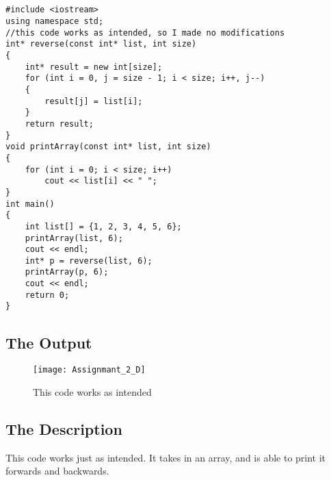 \documentclass[11pt]{article}
\begin{document}
\subsection*{}
\begin{lstlisting}
#include <iostream>
using namespace std;
//this code works as intended, so I made no modifications
int* reverse(const int* list, int size)
{
    int* result = new int[size];
    for (int i = 0, j = size - 1; i < size; i++, j--)
    {
        result[j] = list[i];
    }
    return result;
}
void printArray(const int* list, int size)
{
    for (int i = 0; i < size; i++)
        cout << list[i] << " ";
}
int main()
{
    int list[] = {1, 2, 3, 4, 5, 6};
    printArray(list, 6);
    cout << endl;
    int* p = reverse(list, 6);
    printArray(p, 6);
    cout << endl;
    return 0;
}
\end{lstlisting}

\subsection*{The Output}
\begin{figure}[H]
    \centering
    \texttt{[image: Assignmant\_2\_D]}
    \caption{This code works as intended}
    \label{fig:my_label}
\end{figure}

\subsection*{The Description}
This code works just as intended. It takes in an array, and is able to print it forwards and backwards. 
\end{document}
